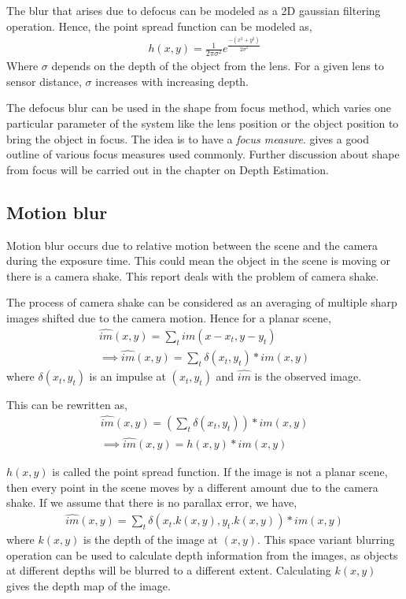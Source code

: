 \documentclass[BTech]{iitmdiss}
\begin{document}
The blur that arises due to defocus can be modeled as a 2D gaussian
filtering operation. Hence, the point spread function can be modeled as,
\begin{align*}
h(x,y) = \frac{1}{2\pi\sigma^2}e^\frac{-(x^2+y^2)}{2\sigma^2}
\end{align*}
Where $\sigma$ depends on the depth of the object from the lens. For a 
given lens to sensor distance, $\sigma$ increases with increasing depth.

The defocus blur can be used in the shape from focus method, which 
varies one particular parameter of the system like the lens position or
the object position to bring the object in focus. The idea is to have a 
\emph{focus measure}. \cite{pertuz2013analysis} gives a good outline of 
various focus measures used commonly. Further discussion about shape from focus will be carried out in the chapter on Depth Estimation.

\subsection{Motion blur}
\label{basic_theory:image_blur:motion}
Motion blur occurs due to relative motion between the scene and the 
camera during the exposure time. This could mean the object in the scene
is moving or there is a camera shake. This report deals with the problem
of camera shake.

The process of camera shake can be considered as an averaging of 
multiple sharp images shifted due to the camera motion. Hence for a 
planar scene, 
\begin{align*}
\hat{im}(x,y) = \sum_tim(x-x_t,y-y_t)\\
\implies\hat{im}(x,y) = \sum_t\delta(x_t, y_t)*im(x,y)
\end{align*}
where $\delta(x_t, y_t)$ is an impulse at $(x_t, y_t)$ and $\hat{im}$ is
the observed image.

This can be rewritten as,
\begin{align*}
\hat{im}(x,y) = (\sum_t\delta(x_t, y_t))*im(x,y)\\
\implies \hat{im}(x,y) = h(x,y)*im(x,y)
\end{align*}

$h(x,y)$ is called the point spread function. If the image is not a 
planar scene, then every point in the scene moves by a different amount
due to the camera shake. If we assume that there is no parallax error,
we have,
\begin{align*}
\hat{im}(x,y) = \sum_t\delta(x_t.k(x,y), y_t.k(x,y))*im(x,y)
\end{align*}
where $k(x,y)$ is the depth of the image at $(x,y)$. This space variant
blurring operation can be used to calculate depth information from the 
images, as objects at different depths will be blurred to a different
extent. Calculating $k(x,y)$ gives the depth map of the image.
\end{document}
